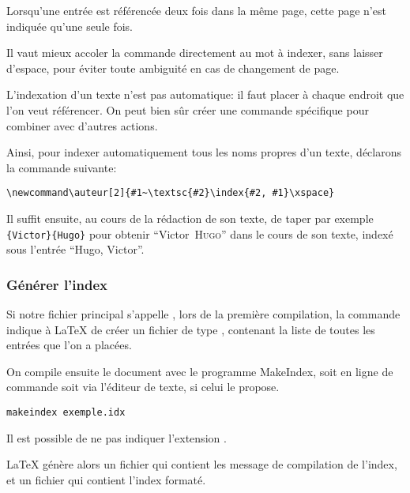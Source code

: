  Lorsqu'une entrée est référencée deux fois dans la même page, cette page n'est indiquée qu'une seule fois. 

\begin{attention}
Il vaut mieux accoler la commande  directement au  mot à indexer, sans laisser d'espace, pour éviter toute ambiguité en cas de changement de page.

\end{attention}


L'indexation d'un texte n'est pas automatique: il faut placer  à chaque endroit  que l'on veut référencer. On  peut bien sûr créer une commande  spécifique pour combiner avec d'autres actions.

Ainsi, pour indexer automatiquement tous les noms propres d'un texte, déclarons la commande suivante:\label{indexauteur}
\begin{verbatim}
\newcommand\auteur[2]{#1~\textsc{#2}\index{#2, #1}\xspace}
\end{verbatim}
\renewcommand\auteur[2]{#1~\textsc{#2}\xspace}

Il suffit ensuite, au cours de la rédaction de son texte, de taper par exemple \verb|{Victor}{Hugo}| pour obtenir \enquote{\auteur{Victor}{Hugo}} dans le cours de son texte, indexé sous l'entrée \enquote{Hugo, Victor}.


\subsubsection{Générer l'index}

Si notre fichier principal s'appelle , lors de la première compilation, la commande  indique à \LaTeX{} de créer un fichier de type , contenant la liste de toutes les entrées que l'on a placées. 
 




On compile ensuite le document avec le programme MakeIndex, soit  en ligne de commande  soit via l'éditeur de texte, si celui le propose.

\begin{verbatim}
makeindex exemple.idx
\end{verbatim}

Il est possible de ne pas indiquer l'extension .

\LaTeX{} génère alors un fichier  qui contient les message de compilation de l'index, et un fichier  qui contient l'index formaté.




